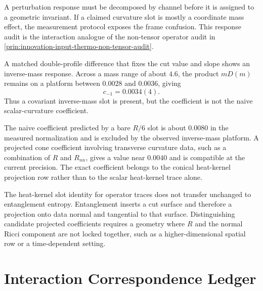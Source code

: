 \begin{principle}
\label{prin:innovation-input-response-audit}
A perturbation response must be decomposed by channel before it is assigned
to a geometric invariant. If a claimed curvature slot is mostly a
coordinate mass effect, the measurement protocol exposes the frame
confusion. This response audit is the interaction analogue of the
non-tensor operator audit in
\autoref{prin:innovation-input-thermo-non-tensor-audit}.
\end{principle}

\begin{principle}
\label{prin:innovation-input-measured-inverse-mass-slot}
A matched double-profile difference that fixes the cut value and slope
shows an inverse-mass response. Across a mass range of about $4.6$, the
product $mD(m)$ remains on a platform between $0.0028$ and $0.0036$,
giving
$$
c_{-1}=0.0034(4).
$$
Thus a covariant inverse-mass slot is present, but the coefficient is not
the naive scalar-curvature coefficient.
\end{principle}

\begin{principle}
\label{prin:innovation-input-projected-curvature-coefficient}
The naive coefficient predicted by a bare $R/6$ slot is about $0.0080$ in
the measured normalization and is excluded by the observed inverse-mass
platform. A projected cone coefficient involving transverse curvature data,
such as a combination of $R$ and $R_{nn}$, gives a value near $0.0040$ and
is compatible at the current precision. The exact coefficient belongs to
the conical heat-kernel projection row rather than to the scalar
heat-kernel trace alone.
\end{principle}

\begin{principle}
\label{prin:innovation-input-slot-boundary}
The heat-kernel slot identity for operator traces does not transfer
unchanged to entanglement entropy. Entanglement inserts a cut surface and
therefore a projection onto data normal and tangential to that surface.
Distinguishing candidate projected coefficients requires a geometry where
$R$ and the normal Ricci component are not locked together, such as a
higher-dimensional spatial row or a time-dependent setting.
\end{principle}

\section{Interaction Correspondence Ledger}
\label{sec:innovation-input-interaction-correspondence-ledger}

